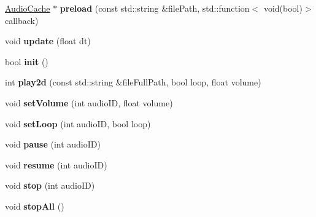 \begin{DoxyCompactItemize}
\hyperlink{classexperimental_1_1AudioCache}{Audio\+Cache} $\ast$ {\bfseries preload} (const std\+::string \&file\+Path, std\+::function$<$ void(bool)$>$ callback)
\item 
\mbox{\label{classexperimental_1_1AudioEngineImpl_a0aa9187ac5e5341a505cf6154feceaee}} 
void {\bfseries update} (float dt)
\item 
\mbox{\label{classexperimental_1_1AudioEngineImpl_a908e5136201a8a6b53ae5c292329f82b}} 
bool {\bfseries init} ()
\item 
\mbox{\label{classexperimental_1_1AudioEngineImpl_a04b788a8319f5d7f90e297a2a345f745}} 
int {\bfseries play2d} (const std\+::string \&file\+Full\+Path, bool loop, float volume)
\item 
\mbox{\label{classexperimental_1_1AudioEngineImpl_aaa11ae7fe8bfd4c4365c02aa71f119b0}} 
void {\bfseries set\+Volume} (int audio\+ID, float volume)
\item 
\mbox{\label{classexperimental_1_1AudioEngineImpl_afd6600a03fa747d44c79f09fbc41b373}} 
void {\bfseries set\+Loop} (int audio\+ID, bool loop)
\item 
\mbox{\label{classexperimental_1_1AudioEngineImpl_a9c4026caed1c625774d3fd1e2114322a}} 
void {\bfseries pause} (int audio\+ID)
\item 
\mbox{\label{classexperimental_1_1AudioEngineImpl_ad180e0563cfb6944074a19304152d990}} 
void {\bfseries resume} (int audio\+ID)
\item 
\mbox{\label{classexperimental_1_1AudioEngineImpl_a56856900e92d2a4c19ea1a629bf19393}} 
void {\bfseries stop} (int audio\+ID)
\item 
\mbox{\label{classexperimental_1_1AudioEngineImpl_abcf87e42d6015ae5a0760ce815fb6f28}} 
void {\bfseries stop\+All} ()
\item 
\mbox{\label{classexperimental_1_1AudioEngineImpl_a12fa2f700f4d6e4effc72e1ad7e030cb}} 

\end{DoxyCompactItemize}
